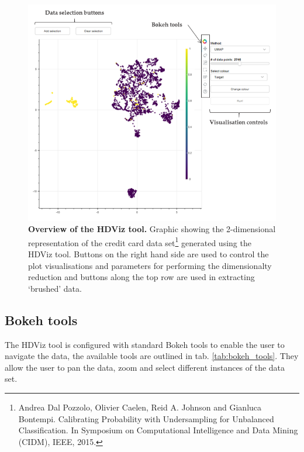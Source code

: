 \documentclass[11pt]{article} %
\begin{document}
\begin{figure}[!h]
\centering
\includegraphics[width=4.5in]{images/HDViz_tool_annotated.png}
\caption{\textbf{Overview of the HDViz tool.} Graphic showing the 2-dimensional representation of the credit card data set\protect\footnote{Andrea Dal Pozzolo, Olivier Caelen, Reid A. Johnson and Gianluca Bontempi. Calibrating Probability with Undersampling for Unbalanced Classification. In Symposium on Computational Intelligence and Data Mining (CIDM), IEEE, 2015.} generated using the HDViz tool. Buttons on the right hand side are used to control the plot visualisations and parameters for performing the dimensionalty reduction and buttons along the top row are used in extracting `brushed' data.}
\label{fig:HDplot}
\end{figure}

\subsection{Bokeh tools}

The HDViz tool is configured with standard Bokeh tools to enable the user to navigate the data, the available tools are outlined in tab. \ref{tab:bokeh_tools}. They allow the user to pan the data, zoom and select different instances of the data set.
\end{document}

